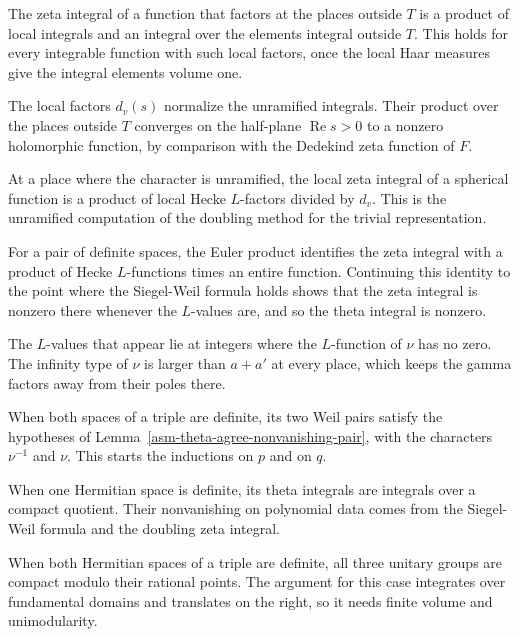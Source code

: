 The zeta integral of a function that factors at the places outside $T$ is a
product of local integrals and an integral over the elements integral outside
$T$. This holds for every integrable function with such local factors, once
the local Haar measures give the integral elements volume one.

The local factors $d_v(s)$ normalize the unramified integrals. Their product
over the places outside $T$ converges on the half-plane
$\operatorname{Re}s>0$ to a nonzero holomorphic function, by comparison with
the Dedekind zeta function of $F$.

At a place where the character is unramified, the local zeta integral of a
spherical function is a product of local Hecke $L$-factors divided by $d_v$.
This is the unramified computation of the doubling method for the trivial
representation.

For a pair of definite spaces, the Euler product identifies the zeta integral
with a product of Hecke $L$-functions times an entire function. Continuing
this identity to the point where the Siegel-Weil formula holds shows that the
zeta integral is nonzero there whenever the $L$-values are, and so the theta
integral is nonzero.

The $L$-values that appear lie at integers where the $L$-function of $\nu$ has
no zero. The infinity type of $\nu$ is larger than $a+a'$ at every place,
which keeps the gamma factors away from their poles there.

When both spaces of a triple are definite, its two Weil pairs satisfy the
hypotheses of Lemma~\ref{asm-theta-agree-nonvanishing-pair}, with the
characters $\nu^{-1}$ and $\nu$. This starts the inductions on $p$ and on $q$.

When one Hermitian space is definite, its theta integrals are integrals over a
compact quotient. Their nonvanishing on polynomial data comes from the
Siegel-Weil formula and the doubling zeta integral.

When both Hermitian spaces of a triple are definite, all three unitary groups
are compact modulo their rational points. The argument for this case
integrates over fundamental domains and translates on the right, so it needs
finite volume and unimodularity.

